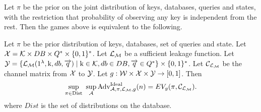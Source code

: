 Let $\pi$ be the prior on the joint distribution of keys, databases, queries and states, with the restriction that probability of observing any key is independent from the rest. Then the games above is equivalent to the following.
\begin{pchstack}[center]

\pchspace
{}
\end{pchstack}


\begin{theorem}
	Let $\pi$ be the prior distribution of keys, databases, set of queries and state. Let $\mathcal{X} = \mathcal{K} \times DB \times Q^{*} \times \{0,1\}^{*}$. Let $\mathcal{L}_\mathcal{M}$ be a sufficient leakage function. Let $\mathcal{Y} = \{\mathcal{L}_\mathcal{M}(1^{\lambda}, \text{k}, db, \overrightarrow{q}) \mid \text{k} \in \mathcal{K}, db \in DB, \overrightarrow{q} \in Q^{*} \} \times \{0,1\}^{*}$. Let $\mathcal{C}_{\mathcal{L}_\mathcal{M}}$ be the channel matrix from $\mathcal{X}$ to $\mathcal{Y}$. Let $g: \mathcal{W} \times \mathcal{X} \times \mathcal{Y} \rightarrow [0,1]$. Then
	\begin{equation}
	\sup_{\pi \in \text{Dist}} \ \sup_{\mathcal{A}} \text{Adv}_{\mathcal{A}, \pi, \mathcal{L}_\mathcal{M}, g}^{\text{Ideal}}(n) = EV_g(\pi, \mathcal{C}_{\mathcal{L}_\mathcal{M}}).
	\end{equation}
	where $Dist$ is the set of distributions on the database.
\end{theorem}


